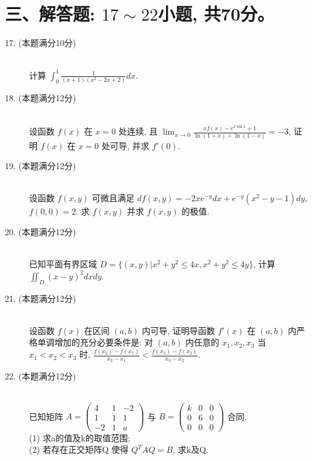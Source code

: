 \documentclass[UTF8]{ctexart}
\begin{document}
\section*{三、解答题: $17\sim22$小题, 共70分。}
\begin{description}

    \item[17. (本题满分10分)] ~\\
    计算 $\int_{0}^{1}\frac{1}{(x+1)(x^{2}-2x+2)}dx$.

    \item[18. (本题满分12分)] ~\\
    设函数 $f(x)$ 在 $x=0$ 处连续, 且 $\lim_{x\rightarrow0}\frac{xf(x)-e^{2\sin x}+1}{\ln(1+x)+\ln(1-x)}=-3$, 证明 $f(x)$ 在 $x=0$ 处可导, 并求 $f'(0)$.
    
    \item[19. (本题满分12分)] ~\\
    设函数 $f(x,y)$ 可微且满足 $df(x,y)=-2xe^{-y}dx+e^{-y}(x^{2}-y-1)dy$, $f(0,0)=2$. 求 $f(x,y)$ 并求 $f(x,y)$ 的极值.

    \item[20. (本题满分12分)] ~\\
    已知平面有界区域 $D=\{(x,y)|x^{2}+y^{2}\le4x,x^{2}+y^{2}\le4y\}$, 计算 $\iint_{D}(x-y)^{2}dxdy$.
    
    \item[21. (本题满分12分)] ~\\
    设函数 $f(x)$ 在区间 $(a,b)$ 内可导, 证明导函数 $f'(x)$ 在 $(a,b)$ 内严格单调增加的充分必要条件是: 对 $(a,b)$ 内任意的 $x_{1},x_{2},x_{3}$ 当 $x_{1}<x_{2}<x_{3}$ 时, $\frac{f(x_{2})-f(x_{1})}{x_{2}-x_{1}}<\frac{f(x_{3})-f(x_{2})}{x_{3}-x_{2}}$.

    \item[22. (本题满分12分)] ~\\
    已知矩阵 $A=\begin{pmatrix}4&1&-2\\ 1&1&1\\ -2&1&a\end{pmatrix}$ 与 $B=\begin{pmatrix}k&0&0\\ 0&6&0\\ 0&0&0\end{pmatrix}$ 合同. \\
    (1) 求a的值及k的取值范围; \\
    (2) 若存在正交矩阵Q 使得 $Q^{T}AQ=B$, 求k及Q.

\end{description}
\end{document}
